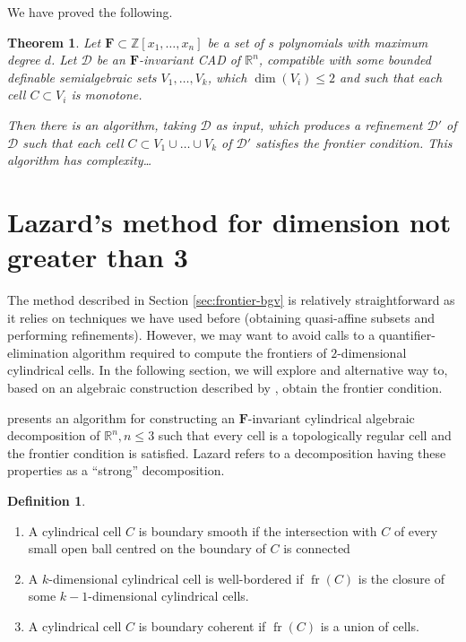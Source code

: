 \documentclass[
]{book}
\providecommand{\tightlist}{%
  \setlength{\itemsep}{0pt}\setlength{\parskip}{0pt}}
\newtheorem{theorem}{Theorem}[chapter]
\theoremstyle{definition}
\newtheorem{definition}{Definition}[chapter]
\theoremstyle{definition}
\theoremstyle{definition}
\theoremstyle{definition}
\theoremstyle{remark}
\begin{document}
We have proved the following.

\begin{theorem}
\protect\hypertarget{thm:lazard-rn}{}\label{thm:lazard-rn}Let \(\mathbf{F} \subset \mathbb{Z}[x_1,\ldots,x_n]\) be a set of \(s\) polynomials with maximum degree \(d\).
Let \(\mathcal{D}\) be an \(\mathbf{F}\)-invariant CAD of \(\mathbb{R}^n\), compatible with some bounded definable semialgebraic sets \(V_1,\ldots,V_k\), which \(\dim(V_i) \le 2\) and such that each cell \(C \subset V_i\) is monotone.

Then there is an algorithm, taking \(\mathcal{D}\) as input, which produces a refinement \(\mathcal{D'}\) of \(\mathcal{D}\) such that each cell \(C \subset V_1\cup\ldots\cup V_k\) of \(\mathcal{D'}\) satisfies the frontier condition.
This algorithm has complexity\ldots{}
\end{theorem}

\hypertarget{sec:lazard-3}{%
\section{Lazard's method for dimension not greater than 3}\label{sec:lazard-3}}

The method described in Section \ref{sec:frontier-bgv} is relatively straightforward as it relies on techniques we have used before (obtaining quasi-affine subsets and performing refinements). However, we may want to avoid calls to a quantifier-elimination algorithm required to compute the frontiers of \(2\)-dimensional cylindrical cells.
In the following section, we will explore and alternative way to, based on an algebraic construction described by \citet{lazard10}, obtain the frontier condition.

\citet{lazard10} presents an algorithm for constructing an \(\mathbf{F}\)-invariant cylindrical algebraic decomposition of \(\mathbb{R}^n, n\le 3\) such that every cell is a topologically regular cell and the frontier condition is satisfied.
Lazard refers to a decomposition having these properties as a ``strong'' decomposition.

\begin{definition}
\protect\hypertarget{def:laz-properties}{}\label{def:laz-properties}

\citep[Definition 2.7]{lazard10}

\begin{enumerate}
\def\labelenumi{\arabic{enumi}.}
\tightlist
\item
  A cylindrical cell \(C\) is boundary smooth if the intersection with \(C\) of every small open ball centred on the boundary of \(C\) is connected
\item
  A \(k\)-dimensional cylindrical cell is well-bordered if \({\operatorname{fr} \left( C \right)}\) is the closure of some \(k-1\)-dimensional cylindrical cells.
\item
  A cylindrical cell \(C\) is boundary coherent if \({\operatorname{fr} \left( C \right)}\) is a union of cells.
\end{enumerate}

\end{definition}
\end{document}
